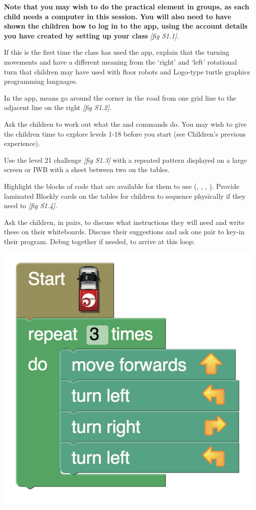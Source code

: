 \documentclass{../../../lessonplan}
\begin{document}
\begin{lessonplan}

\textbf{
Note that you may wish to do the practical element in groups, as each child needs a computer in this session.
You will also need to have shown the children how to log in to the app, using the account details you have created by setting up your class} \textit{[fig S1.1]}.


If this is the first time the class has used the app, explain that the turning movements  and  have a different meaning from the `right' and `left' rotational turn that children may have used with floor robots and Logo-type turtle graphics programming languages.

In the app,  means go around the corner in the road from one grid line to the adjacent line on the right \textit{[fig S1.2]}.


Ask the children to work out what the  and  commands do.
You may wish to give the children time to explore levels 1-18 before you start (see Children's previous experience).

Use the level 21 challenge \textit{[fig S1.3]} with a repeated pattern displayed on a large screen or IWB with a sheet between two on the tables.


Highlight the blocks of code that are available for them to use (, , , ).
Provide laminated Blockly cards on the tables for children to sequence physically if they need to \textit{[fig S1.4]}.



Ask the children, in pairs, to discuss what instructions they will need and write these on their whiteboards.
Discuss their suggestions and ask one pair to key-in their program.
Debug together if needed, to arrive at this  loop:

\includegraphics[width=.5\linewidth]{repeat_loop.jpg}



\end{lessonplan}
\end{document}
